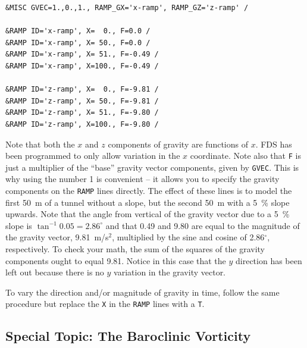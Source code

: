 \documentclass[11pt]{book}
\newcommand{\ct}{\tt\small}
\begin{document}
\footnotesize
\begin{verbatim}
&MISC GVEC=1.,0.,1., RAMP_GX='x-ramp', RAMP_GZ='z-ramp' /

&RAMP ID='x-ramp', X=  0., F=0.0 /
&RAMP ID='x-ramp', X= 50., F=0.0 /
&RAMP ID='x-ramp', X= 51., F=-0.49 /
&RAMP ID='x-ramp', X=100., F=-0.49 /

&RAMP ID='z-ramp', X=  0., F=-9.81 /
&RAMP ID='z-ramp', X= 50., F=-9.81 /
&RAMP ID='z-ramp', X= 51., F=-9.80 /
&RAMP ID='z-ramp', X=100., F=-9.80 /
\end{verbatim} \normalsize

\noindent
Note that both the $x$ and $z$ components of gravity are functions of $x$. FDS has been programmed to only allow variation in the
$x$ coordinate. Note also that {\ct F} is just a multiplier of the ``base'' gravity vector components, given by {\ct GVEC}. This is why
using the number 1 is convenient -- it allows you to specify the gravity components on the {\ct RAMP} lines directly.
The effect of these lines is to model the first 50~m of a tunnel without a slope, but the second 50~m with a 5~\% slope
upwards. Note that the angle from vertical of the gravity vector due to a 5~\% slope is $\tan^{-1} 0.05=2.86^\circ$ and that
0.49 and 9.80 are equal to the magnitude of the gravity vector, 9.81~m/s$^2$, multiplied by the sine and cosine of 2.86$^\circ$,
respectively. To check your math, the sum of the squares of the gravity components ought to equal 9.81.
Notice in this case that the $y$ direction has been left out because there is no $y$ variation in the gravity vector.

To vary the direction and/or magnitude of gravity in time, follow the same procedure but replace the {\ct X} in the {\ct RAMP}
lines with a {\ct T}.










\subsection{Special Topic: The Baroclinic Vorticity}
\label{baroclinic_torque}
\end{document}
